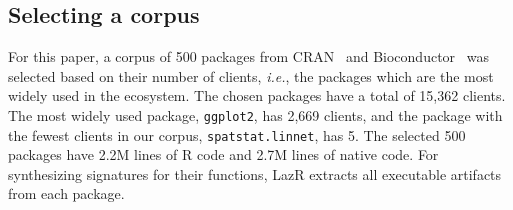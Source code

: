 \documentclass[review,nonacm,screen,acmsmall,anonymous=true]{acmart}
\renewcommand{\c}[1]{\lstinline |#1|\xspace}
\newcommand{\lazr}{{\sf LazR}\xspace}
\begin{document}
\subsection{Selecting a corpus}\label{sec:corpus}

For this paper, a corpus of 500 packages from CRAN~\cite{ligges2017} and
Bioconductor~\cite{bioc} was selected based on their number of clients,
\emph{i.e.}, the packages which are the most widely used in the ecosystem. The
chosen packages have a total of 15,362 clients. The most widely used package,
\c{ggplot2}, has 2,669 clients, and the package with the fewest clients in our
corpus, \c{spatstat.linnet}, has 5. The selected 500 packages have 2.2M lines of
R code and 2.7M lines of native code. For synthesizing signatures for their
functions, \lazr extracts all executable artifacts from each package.
\end{document}
